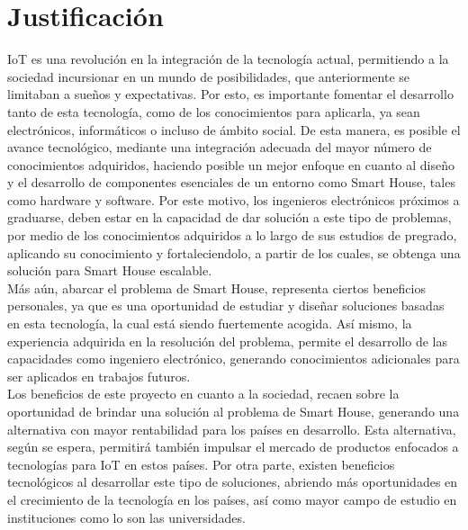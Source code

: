 \chapter{Justificación}

IoT es una revolución en la integración de la tecnología actual, permitiendo a la sociedad incursionar en un mundo de posibilidades, que anteriormente se limitaban a  sueños y expectativas. Por esto, es importante fomentar el desarrollo tanto de esta tecnología, como de los conocimientos para aplicarla, ya sean electrónicos, informáticos o incluso de ámbito social. De esta manera, es posible el avance tecnológico, mediante una integración adecuada del mayor número de conocimientos adquiridos, haciendo posible un mejor enfoque en cuanto al diseño y el desarrollo de componentes esenciales de un entorno como Smart House, tales como hardware y software. Por este motivo, los ingenieros electrónicos próximos a graduarse, deben estar en la capacidad de dar solución a este tipo de problemas, por medio de los conocimientos adquiridos a lo largo de sus estudios de pregrado, aplicando su conocimiento y fortaleciendolo, a partir de los cuales, se obtenga una solución para Smart House escalable. \\

Más aún, abarcar el problema de Smart House, representa ciertos beneficios personales, ya que es una oportunidad de estudiar y diseñar soluciones basadas en esta tecnología, la cual está siendo fuertemente acogida. Así mismo, la experiencia adquirida en la resolución del problema, permite el desarrollo de las capacidades como ingeniero electrónico, generando conocimientos adicionales para ser aplicados en trabajos futuros.\\

Los beneficios de este proyecto en cuanto a la sociedad, recaen sobre la oportunidad de brindar una solución al problema de Smart House, generando una alternativa con mayor rentabilidad para los países en desarrollo. Esta alternativa, según se espera, permitirá también impulsar el mercado de productos enfocados a tecnologías para IoT en estos países. Por otra parte, existen beneficios tecnológicos al desarrollar este tipo de soluciones, abriendo más oportunidades en el crecimiento de la tecnología en los países, así como mayor campo de estudio en instituciones como lo son las universidades.\\

